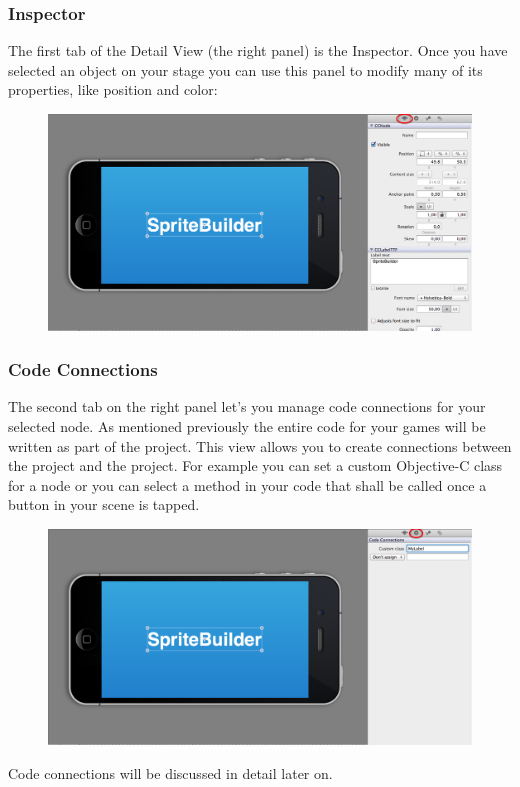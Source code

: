 \subsubsection{Inspector}
The first tab of the Detail View (the right panel) is
the Inspector. Once you have selected an object on your stage you can use this panel to modify many of its properties, like position and color:
\begin{figure}[H]
		\centering
		\includegraphics[width=0.9\linewidth]{images/spritebuilder/spritebuilder_inspector.png}     
\end{figure} 

\subsubsection{Code Connections} 
The second tab on the right panel let's you manage code connections for your
selected node. As mentioned previously the entire code for your games will be
written as part of the \xcode{} project. This view allows you to create
connections between the \xcode{} project and the \SB{} project. For example you can set a custom Objective-C class for a node or you can select
a method in your code that shall be called once a button in your scene is tapped. 

\begin{figure}[H]
		\centering
		\includegraphics[width=0.9\linewidth]{images/spritebuilder/spritebuilder_codeconnections.png}     
\end{figure} 
Code connections will be discussed in detail later on.

